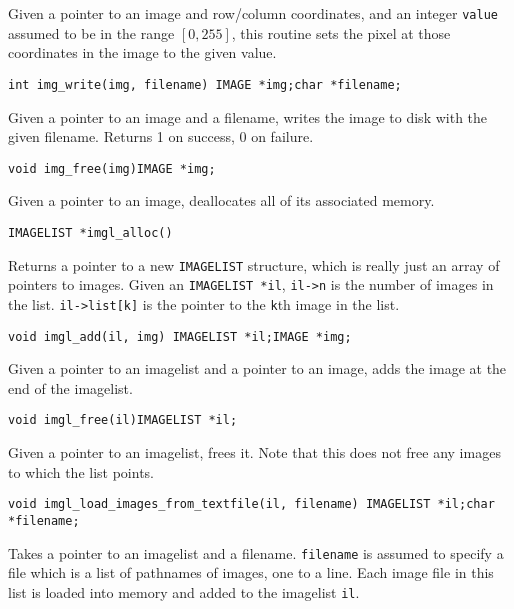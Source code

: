 \begin{description}
Given a pointer to an image and row/column coordinates, and an integer
{\tt value}
assumed to be in the range $[0, 255]$, this routine sets the pixel
at those coordinates in the image to the given value.

\item {\tt int img\_write(img, filename)\newline
IMAGE *img;\newline char *filename;}

Given a pointer to an image and a filename, writes the image to disk with
the given filename.  Returns 1 on success, 0 on failure.

\item {\tt void img\_free(img)\newline IMAGE *img;}

Given a pointer to an image, deallocates all of its associated memory.

\item {\tt IMAGELIST *imgl\_alloc()}

Returns a pointer to a new {\tt IMAGELIST} structure, which is really just
an array of pointers to images.  Given an {\tt IMAGELIST *il},
{\tt il->n} is the number of images in the list.  {\tt il->list[k]}
is the pointer to the {\tt k}th image in the list.

\item {\tt void imgl\_add(il, img)\newline
IMAGELIST *il;\newline IMAGE *img;}

Given a pointer to an imagelist and a pointer to an image, adds the image
at the end of the imagelist.

\item {\tt void imgl\_free(il)\newline IMAGELIST *il;}

Given a pointer to an imagelist, frees it.  Note that this does not
free any images to which the list points.

\item {\tt void imgl\_load\_images\_from\_textfile(il, filename)\newline
IMAGELIST *il;\newline char *filename;}

Takes a pointer to an imagelist and a filename.  {\tt filename} is
assumed to specify a file which is a list of pathnames of images,
one to a line.  Each image file in this list is loaded into memory
and added to the imagelist {\tt il}.

\end{description}

